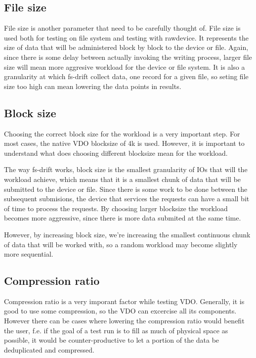 \documentclass[
  color, %
  table, %
  lof,   %
  lot,   %
]{fithesis3}
\begin{document}
\subsection{File size}
File size is another parameter that need to be carefully thought of. File size is used both for testing on file system and testing with rawdevice. It represents the size of data that will be administered block by block to the device or file. Again, since there is some delay between actually invoking the writing process, larger file size will mean more aggresive workload for the device or file system. It is also a granularity at which fs-drift collect data, one record for a given file, so seting file size too high can mean lowering the data points in results.

\subsection{Block size}
Choosing the correct block size for the workload is a very important step. For most cases, the native VDO blocksize of 4k is used. However, it is important to understand what does choosing different blocksize mean for the workload.

The way fs-drift works, block size is the smallest granularity of IOs that will the workload achieve, which means that it is a smallest chunk of data that will be submitted to the device or file. Since there is some work to be done between the subsequent submisions, the device that services the requests can have a small bit of time to process the requests. By choosing larger blocksize the workload becomes more aggressive, since there is more data submited at the same time.

However, by increasing block size, we're increasing the smallest continuous chunk of data that will be worked with, so a random workload may become slightly more sequential.

\subsection{Compression ratio}
Compression ratio is a very imporant factor while testing VDO. Generally, it is good to use some compression, so the VDO can excercise all its components. However there can be cases where lowering the compression ratio would benefit the user, f.e. if the goal of a test run is to fill as much of physical space as possible, it would be counter-productive to let a portion of the data be deduplicated and compressed.
\end{document}
